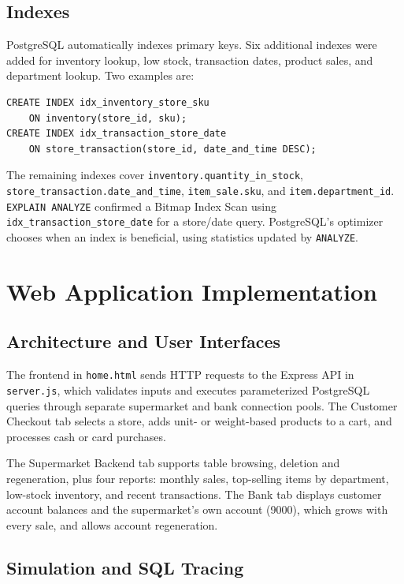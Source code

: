 \documentclass[11pt,letterpaper]{article}
\begin{document}
\subsection{Indexes}

PostgreSQL automatically indexes primary keys. Six additional indexes were added for inventory lookup, low stock, transaction dates, product sales, and department lookup. Two examples are:

\begin{lstlisting}
CREATE INDEX idx_inventory_store_sku
    ON inventory(store_id, sku);
CREATE INDEX idx_transaction_store_date
    ON store_transaction(store_id, date_and_time DESC);
\end{lstlisting}

The remaining indexes cover \texttt{inventory.quantity\_in\_stock}, \texttt{store\_transaction.date\_and\_time}, \texttt{item\_sale.sku}, and \texttt{item.department\_id}. \texttt{EXPLAIN ANALYZE} confirmed a Bitmap Index Scan using \texttt{idx\_transaction\_store\_date} for a store/date query. PostgreSQL's optimizer chooses when an index is beneficial, using statistics updated by \texttt{ANALYZE}.

\section{Web Application Implementation}

\subsection{Architecture and User Interfaces}

The frontend in \texttt{home.html} sends HTTP requests to the Express API in \texttt{server.js}, which validates inputs and executes parameterized PostgreSQL queries through separate supermarket and bank connection pools. The Customer Checkout tab selects a store, adds unit- or weight-based products to a cart, and processes cash or card purchases.

The Supermarket Backend tab supports table browsing, deletion and regeneration, plus four reports: monthly sales, top-selling items by department, low-stock inventory, and recent transactions. The Bank tab displays customer account balances and the supermarket's own account (9000), which grows with every sale, and allows account regeneration.


\subsection{Simulation and SQL Tracing}
\end{document}
